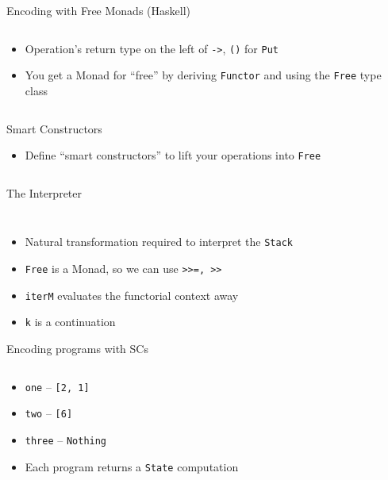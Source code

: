 \documentclass[hyperref={pdfpagelabels=false},12pt]{beamer}
\newcommand{\code}[2]{\texttt{#2}}
\newcommand{\haskell}[1]{\code{haskell}{#1}}
\newcommand{\pygmentLines}[5]{\inputminted[bgcolor=lightgray,linenos,fontsize=#1,firstline=#2,lastline=#3,autogobble]{#4}{#5}}
\begin{document}
\begin{frame}{Encoding with Free Monads (Haskell)}
  \pygmentLines{\normalsize}{17}{21}{haskell}{code/Free.hs}
  \vspace{-0.5cm}
  \begin{itemize}
    \item Operation's return type on the left of \haskell{->}, \haskell{()} for
      \haskell{Put}
    \item You get a Monad for ``free'' by deriving \haskell{Functor} and
      using the \haskell{Free} type class
  \end{itemize}
  \pygmentLines{\normalsize}{23}{23}{haskell}{code/Free.hs}
\end{frame}

\begin{frame}{Smart Constructors}
  \begin{itemize}
    \item Define ``smart constructors'' to lift your operations into \haskell{Free}
  \end{itemize}
  \pygmentLines{\normalsize}{25}{32}{haskell}{code/Free.hs}
\end{frame}

\begin{frame}{The Interpreter}
  \pygmentLines{\scriptsize}{10}{11}{haskell}{code/Free.hs}
  \vspace{-1cm}
  \pygmentLines{\normalsize}{34}{40}{haskell}{code/Free.hs}
  \vspace{-0.5cm}
  \begin{itemize}
    \item Natural transformation required to interpret the \haskell{Stack}
    \item \haskell{Free} is a Monad, so we can use \haskell{>>=, >>}
    \item \haskell{iterM} evaluates the functorial context away
    \item \haskell{k} is a continuation
  \end{itemize}
\end{frame}

\begin{frame}{Encoding programs with SCs}
  \pygmentLines{\scriptsize}{42}{56}{haskell}{code/Free.hs}
  \vspace{-0.5cm}
  \begin{itemize}
    \item \haskell{one} -- \haskell{[2, 1]}
    \item \haskell{two} -- \haskell{[6]}
    \item \haskell{three} -- \haskell{Nothing}
    \item Each program returns a \haskell{State} computation
  \end{itemize}
\end{frame}
\end{document}
